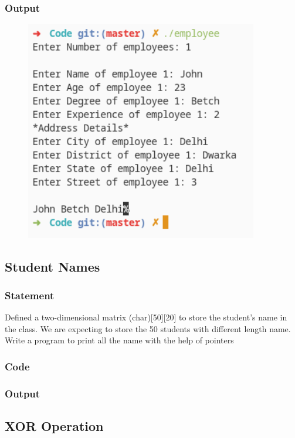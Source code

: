 \subsubsection{Output}
\begin{figure}[!htb]
  \centering
  \includegraphics[width=4in]{Images/employee.png}
  \label{output:4}
\end{figure}


\pagebreak
\subsection{Student Names}

\subsubsection{Statement}
Defined a two-dimensional matrix (char)[50][20] to store the student’s name in the class.
We are expecting to store the 50 students with different length name. Write a program to print all
the name with the help of pointers

\subsubsection{Code}

\subsubsection{Output}

\pagebreak
\subsection{XOR Operation}

